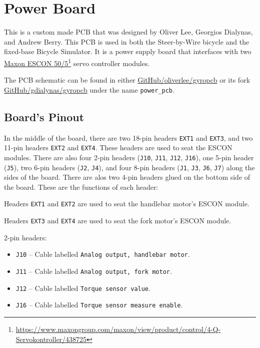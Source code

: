 \section{Power Board}
This is a custom made PCB that was designed by Oliver Lee, Georgios Dialynas, and Andrew Berry. This PCB is used in both the Steer-by-Wire bicycle and the fixed-base Bicycle Simulator. It is a power supply board that interfaces with two \href{https://www.maxongroup.com/maxon/view/product/control/4-Q-Servokontroller/438725}{Maxon ESCON 50/5}\footnote{\href{https://www.maxongroup.com/maxon/view/product/control/4-Q-Servokontroller/438725}{https://www.maxongroup.com/maxon/view/product/control/4-Q-Servokontroller/438725}} servo controller modules.

The PCB schematic can be found in either \href{https://github.com/oliverlee/gyropcb}{GitHub/oliverlee/gyropcb} or its fork \href{https://github.com/gdialynas/gyropcb}{GitHub/gdialynas/gyropcb} under the name \verb|power_pcb|.

\subsection{Board's Pinout}
In the middle of the board, there are two 18-pin headers \verb|EXT1| and \verb|EXT3|, and two 11-pin headers \verb|EXT2| and \verb|EXT4|. These headers are used to seat the ESCON modules. There are also four 2-pin headers (\verb|J10|, \verb|J11|, \verb|J12|, \verb|J16|), one 5-pin header (\verb|J5|), two 6-pin headers (\verb|J2|, \verb|J4|), and four 8-pin headers (\verb|J1|, \verb|J3|, \verb|J6|, \verb|J7|) along the sides of the board. There are alos two 4-pin headers glued on the bottom side of the board. These are the functions of each header:

Headers \verb|EXT1| and \verb|EXT2| are used to seat the handlebar motor's ESCON module.

Headers \verb|EXT3| and \verb|EXT4| are used to seat the fork motor's ESCON module.

2-pin headers:
\begin{itemize}[noitemsep]
  \item \verb|J10| -- Cable labelled \verb|Analog output, handlebar motor|.
  \item \verb|J11| -- Cable labelled \verb|Analog output, fork motor|.
  \item \verb|J12| -- Cable labelled \verb|Torque sensor value|.
  \item \verb|J16| -- Cable labelled \verb|Torque sensor measure enable|.
\end{itemize}

